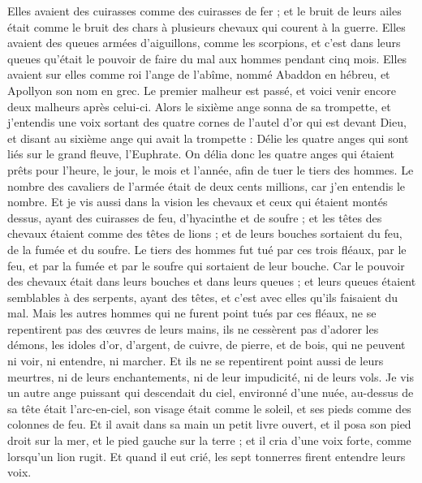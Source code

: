 \begin{multicols}{2}
Elles avaient des cuirasses comme des cuirasses de fer ; et le bruit de leurs ailes était comme le bruit des chars à plusieurs chevaux qui courent à la guerre.
Elles avaient des queues armées d'aiguillons, comme les scorpions, et c'est dans leurs queues qu'était le pouvoir de faire du mal aux hommes pendant cinq mois.
Elles avaient sur elles comme roi l'ange de l'abîme, nommé Abaddon en hébreu, et Apollyon son nom en grec.
Le premier malheur est passé, et voici venir encore deux malheurs après celui-ci.
Alors le sixième ange sonna de sa trompette, et j'entendis une voix sortant des quatre cornes de l'autel d'or qui est devant Dieu,
et disant au sixième ange qui avait la trompette : Délie les quatre anges qui sont liés sur le grand fleuve, l'Euphrate.
On délia donc les quatre anges qui étaient prêts pour l'heure, le jour, le mois et l'année, afin de tuer le tiers des hommes.
Le nombre des cavaliers de l'armée était de deux cents millions, car j'en entendis le nombre.
Et je vis aussi dans la vision les chevaux et ceux qui étaient montés dessus, ayant des cuirasses de feu, d'hyacinthe et de soufre ; et les têtes des chevaux étaient comme des têtes de lions ; et de leurs bouches sortaient du feu, de la fumée et du soufre.
Le tiers des hommes fut tué par ces trois fléaux, par le feu, et par la fumée et par le soufre qui sortaient de leur bouche.
Car le pouvoir des chevaux était dans leurs bouches et dans leurs queues ; et leurs queues étaient semblables à des serpents, ayant des têtes, et c'est avec elles qu'ils faisaient du mal.
Mais les autres hommes qui ne furent point tués par ces fléaux, ne se repentirent pas des œuvres de leurs mains, ils ne cessèrent pas d'adorer les démons, les idoles d'or, d'argent, de cuivre, de pierre, et de bois, qui ne peuvent ni voir, ni entendre, ni marcher.
Et ils ne se repentirent point aussi de leurs meurtres, ni de leurs enchantements, ni de leur impudicité, ni de leurs vols.
\VerseOne{}Je vis un autre ange puissant qui descendait du ciel, environné d'une nuée, au-dessus de sa tête était l'arc-en-ciel, son visage était comme le soleil, et ses pieds comme des colonnes de feu.
Et il avait dans sa main un petit livre ouvert, et il posa son pied droit sur la mer, et le pied gauche sur la terre ;
et il cria d'une voix forte, comme lorsqu'un lion rugit. Et quand il eut crié, les sept tonnerres firent entendre leurs voix.

\end{multicols}
